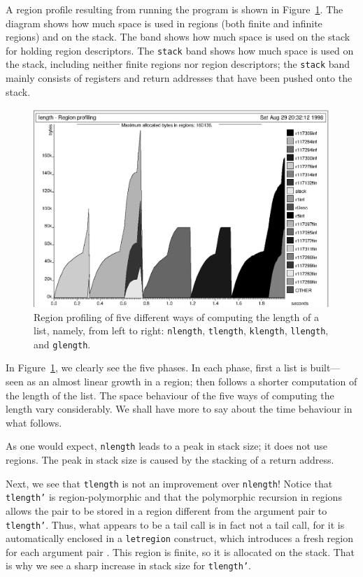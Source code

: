 \documentclass[12pt]{book}
\begin{document}
A region profile resulting from running the program
is shown in Figure~\ref{length.region.fig}.
The diagram shows how much space is used in
regions (both finite and infinite regions) and on the stack. 
The  band shows how much space is used on the stack for
holding region descriptors. The 
%
{\tt stack} band shows how much space is used on the stack, 
including neither finite regions nor region descriptors; the {\tt stack}
band mainly consists of registers and return addresses 
that have been pushed onto the stack. 
\begin{figure}
\begin{center}
\includegraphics{length.region.ps}
\end{center}
\caption{Region profiling of five different
ways of computing the length of a list, namely, from left to right:
{\tt nlength}, {\tt tlength}, {\tt klength}, {\tt llength},
and {\tt glength}.}
\label{length.region.fig}
\end{figure}

In Figure~\ref{length.region.fig}, we clearly see the five phases.  In
each phase, first a list is built---seen as an almost linear growth in
a region; then follows a shorter computation of the length of the
list.  The space behaviour of the five ways of computing the length
vary considerably. We shall have more to say about the time behaviour
in what follows.

As one would expect, {\tt nlength} leads to a peak in stack size; it
does not use regions. The peak in stack size is caused by the stacking
of a return address.

Next, we see that {\tt tlength} is not an improvement over
{\tt nlength}! Notice that {\tt tlength'} is region-polymorphic and that the
polymorphic recursion in regions allows the pair 
to be stored in a region different from  the argument pair to {\tt tlength'}.
Thus, what appears to be a tail call is in fact not a tail call, for
it is automatically enclosed in a {\tt letregion} construct, which introduces
a fresh region for each argument pair . This region is finite, so it is
allocated on the stack. That is why we see a sharp increase in
stack size for {\tt tlength'}.
\end{document}
